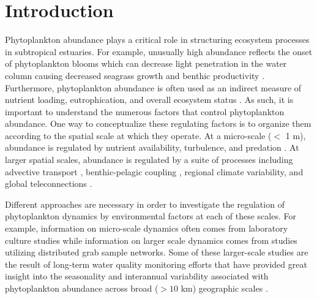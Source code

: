 \section{Introduction}
\label{intro}
Phytoplankton abundance plays a critical role in structuring ecosystem processes in subtropical estuaries. For example, unusually high abundance reflects the onset of phytoplankton blooms which can decrease light penetration in the water column causing decreased seagrass growth and benthic productivity \citep{kelble_2005}. Furthermore, phytoplankton abundance is often used as an indirect measure of nutrient loading, eutrophication, and overall ecosystem status \citep{boyer_2009}. As such, it is important to understand the numerous factors that control phytoplankton abundance. One way to conceptualize these regulating factors is to organize them according to the spatial scale at which they operate. At a micro-scale ($<$ 1 m), abundance is regulated by nutrient availability, turbulence, and predation \citep{mann2013dynamics}. At larger spatial scales, abundance is regulated by a suite of processes including advective transport \citep{dugdale2012river}, benthic-pelagic coupling \citep{zhang_2014, lawrence2004wind}, regional climate variability, and global teleconnections \citep{briceno_climatic_2009}.

Different approaches are necessary in order to investigate the regulation of phytoplankton dynamics by environmental factors at each of these scales. For example, information on micro-scale dynamics often comes from laboratory culture studies while information on larger scale dynamics comes from studies utilizing distributed grab sample networks. Some of these larger-scale studies are the result of long-term water quality monitoring efforts that have provided great insight into the seasonality and interannual variability associated with phytoplankton abundance across broad ($>10$ km) geographic scales \citep{cloern_patterns_2010}.

